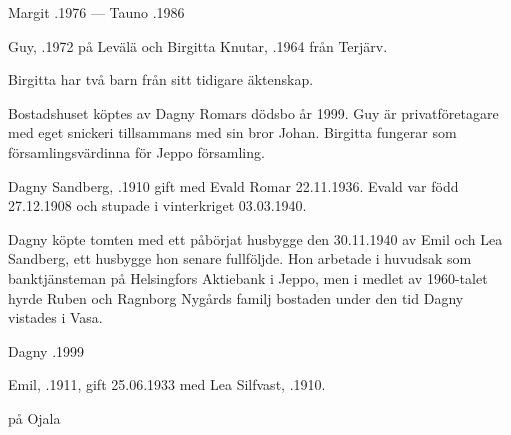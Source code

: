 Margit .1976  ---  Tauno .1986






Guy, .1972 på Levälä och Birgitta Knutar, .1964 från Terjärv.
\begin{jhchildren}
  \item {}
\end{jhchildren}

Birgitta har två barn från sitt tidigare äktenskap.
\begin{jhchildren}
  \item {}
  \item {}
\end{jhchildren}
Bostadshuset köptes av Dagny Romars dödsbo år 1999. Guy är privatföretagare med eget snickeri tillsammans med sin bror Johan. Birgitta fungerar som församlingsvärdinna för Jeppo församling.


Dagny Sandberg, .1910 gift med Evald Romar 22.11.1936. Evald var född 27.12.1908 och stupade i vinterkriget 03.03.1940.
\begin{jhchildren}
  \item {}
  \item {}
\end{jhchildren}
Dagny köpte tomten med ett påbörjat husbygge den 30.11.1940 av Emil och Lea Sandberg, ett husbygge hon senare fullföljde. Hon arbetade i huvudsak som banktjänsteman på Helsingfors Aktiebank i Jeppo, men i medlet av 1960-talet hyrde Ruben och Ragnborg Nygårds familj bostaden under den tid Dagny vistades i Vasa.

Dagny .1999


Emil, .1911, gift 25.06.1933 med Lea Silfvast, .1910.
\begin{jhchildren}
  \item {}
  \item {}
  \item {} på Ojala
\end{jhchildren}


